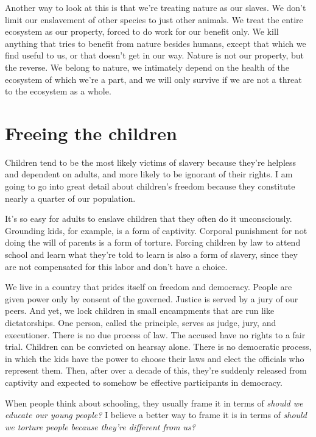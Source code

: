 Another way to look at this is that we're treating nature as our slaves. We don't limit our enslavement of other species to just other animals. We treat the entire ecosystem as our property, forced to do work for our benefit only. We kill anything that tries to benefit from nature besides humans, except that which we find useful to us, or that doesn't get in our way. Nature is not our property, but the reverse. We belong to nature, we intimately depend on the health of the ecosystem of which we're a part, and we will only survive if we are not a threat to the ecosystem as a whole.

\section{Freeing the children}
Children tend to be the most likely victims of slavery because they're helpless and dependent on adults, and more likely to be ignorant of their rights. I am going to go into great detail about children's freedom because they constitute nearly a quarter of our population.\cite{census-quickfacts}

It's so easy for adults to enslave children that they often do it unconsciously. Grounding kids, for example, is a form of captivity. Corporal punishment for not doing the will of parents is a form of torture. Forcing children by law to attend school and learn what they're told to learn is also a form of slavery, since they are not compensated for this labor and don't have a choice.

We live in a country that prides itself on freedom and democracy. People are given power only by consent of the governed. Justice is served by a jury of our peers. And yet, we lock children in small encampments that are run like dictatorships. One person, called the principle, serves as judge, jury, and executioner. There is no due process of law. The accused have no rights to a fair trial. Children can be convicted on hearsay alone. There is no democratic process, in which the kids have the power to choose their laws and elect the officials who represent them. Then, after over a decade of this, they're suddenly released from captivity and expected to somehow be effective participants in democracy.

When people think about schooling, they usually frame it in terms of \emph{should we educate our young people?} I believe a better way to frame it is in terms of \emph{should we torture people because they're different from us?}

